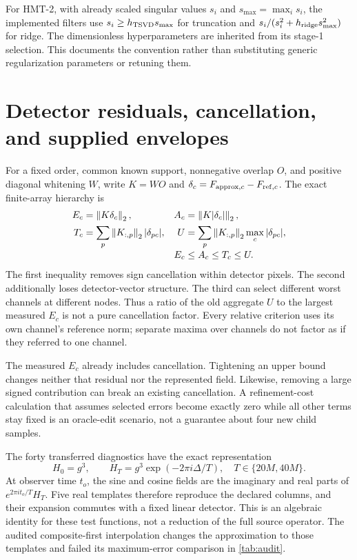 For HMT-2, with already scaled singular values $s_i$ and $s_{\max}=\max_i s_i$, the implemented filters use $s_i\geq h_{\rm TSVD}s_{\max}$ for truncation and $s_i/(s_i^2+h_{\rm ridge}s_{\max}^2)$ for ridge. The dimensionless hyperparameters are inherited from its stage-1 selection. This documents the convention rather than substituting generic regularization parameters or retuning them.

\section{Detector residuals, cancellation, and supplied envelopes}\label{app:bounds}
For a fixed order, common known support, nonnegative overlap $O$, and positive diagonal whitening $W$, write $K=WO$ and $\delta_c=F_{{\rm approx},c}-F_{{\rm ref},c}$. The exact finite-array hierarchy is
\begin{align}
E_c&=\left\lVert K\delta_c\right\rVert_2,
&A_c&=\left\lVert K|\delta_c|\right\rVert_2,\nonumber\\
T_c&=\sum_p\left\lVert K_{:,p}\right\rVert_2|\delta_{pc}|,
&U&=\sum_p\left\lVert K_{:,p}\right\rVert_2\max_c|\delta_{pc}|,\nonumber\\[-0.3em]
&&E_c&\leq A_c\leq T_c\leq U.
\label{eq:boundhierarchy}
\end{align}
The first inequality removes sign cancellation within detector pixels. The second additionally loses detector-vector structure. The third can select different worst channels at different nodes. Thus a ratio of the old aggregate $U$ to the largest measured $E_c$ is not a pure cancellation factor. Every relative criterion uses its own channel's reference norm; separate maxima over channels do not factor as if they referred to one channel.

The measured $E_c$ already includes cancellation. Tightening an upper bound changes neither that residual nor the represented field. Likewise, removing a large signed contribution can break an existing cancellation. A refinement-cost calculation that assumes selected errors become exactly zero while all other terms stay fixed is an oracle-edit scenario, not a guarantee about four new child samples.

The forty transferred diagnostics have the exact representation
\begin{equation}
H_0=g^3,\qquad H_T=g^3\exp(-2\pi i\Delta/T),\quad T\in\{20M,40M\}.
\end{equation}
At observer time $t_o$, the sine and cosine fields are the imaginary and real parts of $e^{2\pi i t_o/T}H_T$. Five real templates therefore reproduce the declared columns, and their expansion commutes with a fixed linear detector. This is an algebraic identity for these test functions, not a reduction of the full source operator. The audited composite-first interpolation changes the approximation to those templates and failed its maximum-error comparison in \cref{tab:audit}.

